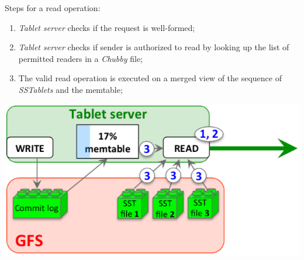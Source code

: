 \bigskip\noindent\begin{minipage}[c]{0.65\textwidth}
    Steps for a read operation:
    \begin{enumerate}
        \item \emph{Tablet server} checks if the request is well-formed;
        \item \emph{Tablet server} checks if sender is authorized to read by
        looking up the list of permitted readers in a \emph{Chubby} file;
        \item The valid read operation is executed on a merged view of the
        sequence of \emph{SSTablets} and the memtable;
    \end{enumerate}
\end{minipage}\hfill
\begin{minipage}[c]{0.33\textwidth}
    \includegraphics[width=\textwidth]{images/gbt-tablet-read.png}
\end{minipage}

